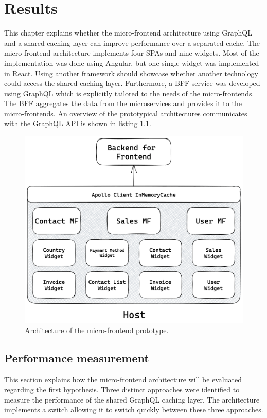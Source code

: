 \chapter{Results}\label{chapter:results}

This chapter explains whether the micro-frontend architecture using GraphQL and a shared caching layer can improve performance over a separated cache. The micro-frontend architecture implements four \acp{SPA} and nine widgets. Most of the implementation was done using Angular, but one single widget was implemented in React. Using another framework should showcase whether another technology could access the shared caching layer. Furthermore, a \ac{BFF} service was developed using GraphQL which is explicitly tailored to the needs of the micro-frontends. The \ac{BFF} aggregates the data from the microservices and provides it to the micro-frontends. An overview of the prototypical architectures communicates with the GraphQL \ac{API} is shown in listing \ref{fig:results:micro-frontend-prototype}.

\ifshowImages
\begin{figure}[H]
  \centering
  \includegraphics[width=0.8\linewidth]{images/results/micro-frontend-prototype.png}
  \caption{Architecture of the micro-frontend prototype.}\label{fig:results:micro-frontend-prototype}
\end{figure}
\fi

\section{Performance measurement}\label{section:results:performance-measurement}

This section explains how the micro-frontend architecture will be evaluated regarding the first hypothesis. Three distinct approaches were identified to measure the performance of the shared GraphQL caching layer. The architecture implements a switch allowing it to switch quickly between these three approaches.

